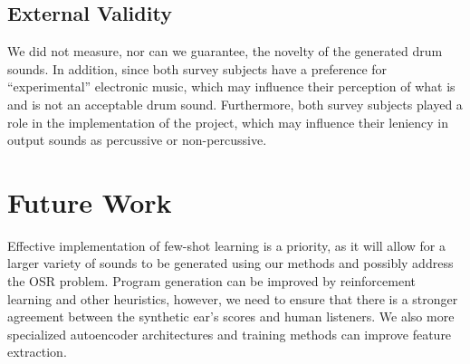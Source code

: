 \documentclass[\main/thesis.tex]{subfiles}
\begin{document}
\subsection{External Validity}
 We did not measure, nor can we guarantee, the novelty of the generated drum sounds. In addition, since both survey subjects have a preference for \enquote{experimental} electronic music, which may influence their perception of what is and is not an acceptable drum sound. Furthermore, both survey subjects played a role in the implementation of the project, which may influence their leniency in output sounds as percussive or non-percussive. 
 
 
\section{Future Work} Effective implementation of few-shot learning is a priority, as it will allow for a larger variety of sounds to be generated using our methods and possibly address the OSR problem. Program generation can be improved by reinforcement learning and other heuristics, however, we need to ensure that there is a stronger agreement between the synthetic ear's scores and human listeners. We also more specialized autoencoder architectures and training methods can improve feature extraction.
\end{document}
